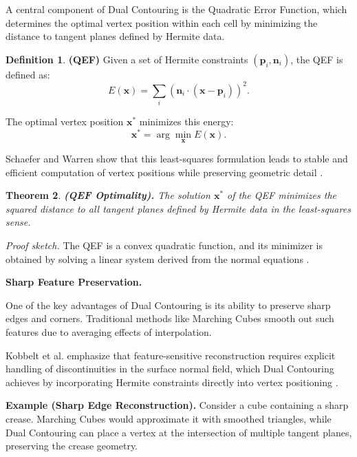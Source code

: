 \documentclass[12pt, a4paper, oneside]{book}
\theoremstyle{plain}
\newtheorem{theorem}{Theorem}[chapter]
\theoremstyle{definition}
\newtheorem{definition}[theorem]{Definition}
\theoremstyle{remark}
\theoremstyle{definition}
\begin{document}
A central component of Dual Contouring is the Quadratic Error Function, which determines the optimal vertex position within each cell by minimizing the distance to tangent planes defined by Hermite data.

\begin{definition}
\textbf{(QEF)}    
Given a set of Hermite constraints $(\mathbf{p}_i, \mathbf{n}_i)$, the QEF is defined as:
\[
E(\mathbf{x}) = \sum_i \left( \mathbf{n}_i \cdot (\mathbf{x} - \mathbf{p}_i) \right)^2.
\]
\end{definition}

The optimal vertex position $\mathbf{x}^*$ minimizes this energy:
\[
\mathbf{x}^* = \arg\min_{\mathbf{x}} E(\mathbf{x}).
\]

Schaefer and Warren show that this least-squares formulation leads to stable and efficient computation of vertex positions while preserving geometric detail \cite{schaefer2005qef,ju2002dual}.

\vspace{0.5em}

\begin{theorem}
    \textbf{ (QEF Optimality).}
The solution $\mathbf{x}^*$ of the QEF minimizes the squared distance to all tangent planes defined by Hermite data in the least-squares sense.
\end{theorem}


\textit{Proof sketch.} The QEF is a convex quadratic function, and its minimizer is obtained by solving a linear system derived from the normal equations \cite{schaefer2005qef}.

\vspace{0.5em}

\textbf{Sharp Feature Preservation.}

One of the key advantages of Dual Contouring is its ability to preserve sharp edges and corners. Traditional methods like Marching Cubes smooth out such features due to averaging effects of interpolation.

Kobbelt et al. emphasize that feature-sensitive reconstruction requires explicit handling of discontinuities in the surface normal field, which Dual Contouring achieves by incorporating Hermite constraints directly into vertex positioning \cite{kobbelt2001feature}.

\textbf{Example (Sharp Edge Reconstruction).}
Consider a cube containing a sharp crease. Marching Cubes would approximate it with smoothed triangles, while Dual Contouring can place a vertex at the intersection of multiple tangent planes, preserving the crease geometry.
\end{document}
